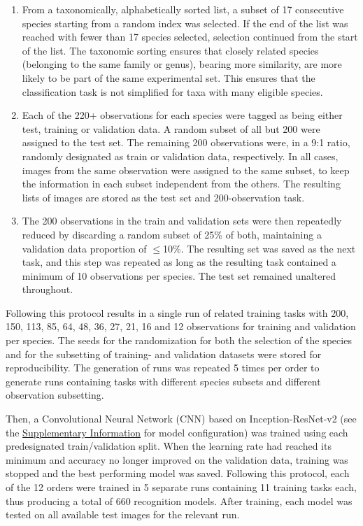 \documentclass{article}
\begin{document}
\begin{enumerate}
\item From a taxonomically, alphabetically sorted list, a subset of 17 consecutive species starting from a random index was selected. If the end of the list was reached with fewer than 17 species selected, selection continued from the start of the list. The taxonomic sorting ensures that closely related species (belonging to the same family or genus), bearing more similarity, are more likely to be part of the same experimental set. This ensures that the classification task is not simplified for taxa with many eligible species.
\item Each of the 220+ observations for each species were tagged as being either test, training or validation data. A random subset of all but 200 were assigned to the test set. The remaining 200 observations were, in a 9:1 ratio, randomly designated as train or validation data, respectively. In all cases, images from the same observation were assigned to the same subset, to keep the information in each subset independent from the others. The resulting lists of images are stored as the test set and 200-observation task.
\item The 200 observations in the train and validation sets were then repeatedly reduced by discarding a random subset of 25\% of both, maintaining a validation data proportion of \(\leq\)10\%. The resulting set was saved as the next task, and this step was repeated as long as the resulting task contained a minimum of 10 observations per species. The test set remained unaltered throughout.
\end{enumerate}

Following this protocol results in a single run of related training tasks with 200, 150, 113, 85, 64, 48, 36, 27, 21, 16 and 12 observations for training and validation per species. The seeds for the randomization for both the selection of the species and for the subsetting of training- and validation datasets were stored for reproducibility. The generation of runs was repeated 5 times per order to generate runs containing tasks with different species subsets and different observation subsetting.

Then, a Convolutional Neural Network (CNN) based on Inception-ResNet-v2\autocite{szegedy2016inceptionv4} (see the \hyperref[sec:model]{Supplementary Information} for model configuration) was trained using each predesignated train/validation split. When the learning rate had reached its minimum and accuracy no longer improved on the validation data, training was stopped and the best performing model was saved. Following this protocol, each of the 12 orders were trained in 5 separate runs containing 11 training tasks each, thus producing a total of 660 recognition models. After training, each model was tested on all available test images for the relevant run.
\end{document}
